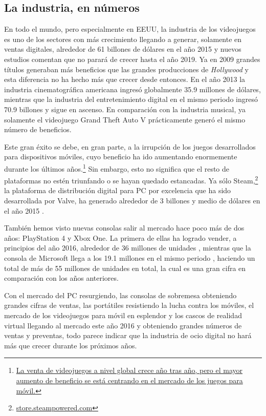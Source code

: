 \subsection{La industria, en números}
En todo el mundo, pero especialmente en EEUU, la industria de los videojuegos es uno de los sectores con más crecimiento \cite{website:gamesimprovingeconomy} llegando a generar, solamente en ventas digitales, alrededor de 61 billones de dólares en el año 2015 \cite{website:gamingsales} y nuevos estudios comentan que no parará de crecer hasta el año 2019.\cite{pwcgames} Ya en 2009 grandes títulos generaban más beneficios que las grandes producciones de \textit{Hollywood}\cite{guardianoutperform} y esta diferencia no ha hecho más que crecer desde entonces. En el año 2013 la industria cinematográfica americana ingresó globalmente 35.9 millones de dólares,\cite{mpaatheatrical} mientras que la industria del entretenimiento digital en el mismo periodo ingresó 70.9 billones\cite{newzoogames} y sigue en ascenso. En comparación con la industria musical, ya solamente el videojuego Grand Theft Auto V prácticamente generó el mismo número de beneficios.\cite{foolgtav}

Este gran éxito se debe, en gran parte, a la irrupción de los juegos desarrollados para dispositivos móviles, cuyo beneficio ha ido aumentando enormemente durante los últimos años.\footnote{\href{https://goo.gl/cvqds0}{La venta de videojuegos a nivel global crece año tras año, pero el mayor aumento de beneficio se está centrando en el mercado de los juegos para móvil.}} Sin embargo, esto no significa que el resto de plataformas no estén triunfando o se hayan quedado estancadas. Ya sólo Steam,\footnote{\url{store.steampowered.com}} la plataforma de distribución digital para PC por excelencia que ha sido desarrollada por Valve, ha generado alrededor de 3 billones y medio de dólares en el año 2015 \cite{website:steamgamesmarket}.

También hemos visto nuevas consolas salir al mercado hace poco más de dos años: PlayStation 4 y Xbox One. La primera de ellas ha logrado vender, a principios del año 2016, alrededor de 36 millones de unidades \cite{website:ps4sales}, mientras que la consola de Microsoft llega a los 19.1 millones en el mismo periodo \cite{website:xboxonesales}, haciendo un total de más de 55 millones de unidades en total, la cual es una gran cifra en comparación con los años anteriores.

Con el mercado del PC resurgiendo, las consolas de sobremesa obteniendo grandes cifras de ventas, las portátiles resistiendo la lucha contra los móviles, el mercado de los videojuegos para móvil en esplendor y los cascos de realidad virtual llegando al mercado este año 2016 y obteniendo grandes números de ventas y preventas, todo parece indicar que la industria de ocio digital no hará más que crecer durante los próximos años.

